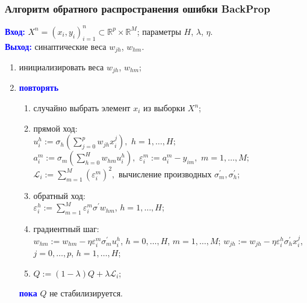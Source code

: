 \documentclass[unicode, notheorems]{beamer}
\begin{document}
\begin{frame}
	\frametitle{Алгоритм обратного распространения ошибки BackProp}
	\textcolor{blue}{\bfseries Вход:} $X^n = (x_i, y_i)_{i=1}^{n} \subset \mathbb{R}^p \times \mathbb{R}^M$; параметры $H$, $\lambda$, $\eta$.\\
	\textcolor{blue}{\bfseries Выход:} синаптические веса $w_{jh}$, $w_{hm}$. \\
	\begin{enumerate}
	\item инициализировать веса $w_{jh}$, $w_{hm}$;\\
	\item \textcolor{blue}{\bfseries повторять} \\
	    \begin{enumerate}
	\item случайно выбрать элемент  $x_i$ из выборки $X^n$; 
	\item прямой ход:\\
	$u_i^h := \sigma_h \left( \sum_{j=0}^{p} w_{jh} x^j_{i}\right), \,\, h=1,\ldots,H;$
	 $a_i^m := \sigma_m \left( \sum_{h=0}^{H} w_{hm} u_{i}^h \right), \,\, \varepsilon_i^m := a_i^m - y_{im}, \,\, m=1,\ldots,M;$
	$ \mathscr{L}_i := \sum_{m=1}^{M}(\varepsilon_i^m)^2, \text{ вычисление производных } \sigma_m^{'}, \sigma_h^{'}$;
	\item обратный ход:\\
	$\varepsilon_i^h := \sum_{m=1}^M \varepsilon_i^m \sigma^{'} w_{hm}$, $h=1,\ldots,H$;
	\item градиентный шаг:\\
	$w_{hm} := w_{hm} - \eta \varepsilon_i^m \sigma^{'}_m u_i^h$, $h=0,\ldots,H$, $ m=1,\ldots,M$;
	$w_{jh} := w_{jh} - \eta \varepsilon_i^h \sigma^{'}_h x^j_{i}$, $j=0,\ldots,p$, $ h=1,\ldots,H$;
	\item $Q := (1-\lambda) Q + \lambda\mathscr{L}_i$;
	
\end{enumerate}
	 \textcolor{blue}{\bfseries пока} $Q$ не стабилизируется.
	\end{enumerate}
\end{frame} 
\end{document}
